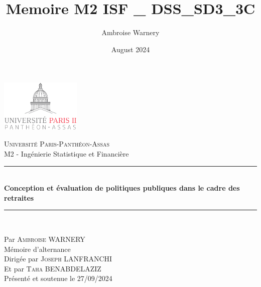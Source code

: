 \documentclass[a4paper,12pt,twoside,french]{book}
\title{Memoire M2 ISF _ DSS_SD3_3C}
\author{Ambroise Warnery}
\date{August 2024}
\begin{document}
	\begin{titlepage}
		\begin{center}
				\includegraphics[height=2.5cm]{figures/cover/logoAssas.png}
		\end{center}
	
		\begin{center}
		
\vspace*{.03\textheight}
\textsc{\LARGE Université Paris-Panthéon-Assas}\\[0.2cm] %
		\large M2 - Ingénierie Statistique et Financière\\
  			\vfill
 
	 		\rule{\textwidth}{0.8pt} \\ %
	 		\vspace{10pt}
	 		 { \LARGE \bfseries Conception et évaluation de politiques publiques dans le cadre des retraites} %
	 		 \vspace{10pt}
	 		 \rule{\textwidth}{0.8pt} \\ %
		\end{center}
		
		\vfill
		\begin{center}
			Par \textsc{\Large Ambroise WARNERY}\\[1cm] 
			Mémoire d'alternance\\[1.2cm]
			Dirigée par \textsc{\large Joseph LANFRANCHI}\\[0.2cm]
            Et par \textsc{\large Taha BENABDELAZIZ}\\[0.2cm] 
			Présenté et soutenue le 27/09/2024 %
		\end{center}
		
		\vspace{1cm}


	\newpage %
	\thispagestyle{empty} %
	\end{titlepage}
\end{document}
